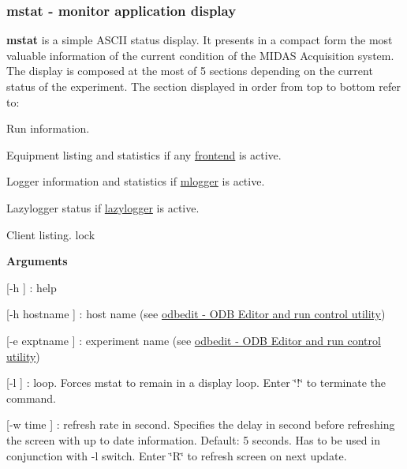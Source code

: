 \par
 \label{RC_Monitor_idx_mstat-utility}
\hypertarget{RC_Monitor_idx_mstat-utility}{}
 \hypertarget{RC_Monitor_RC_mstat_utility}{}\subsubsection{mstat -\/ monitor application display}\label{RC_Monitor_RC_mstat_utility}
{\bfseries mstat} is a simple ASCII status display. It presents in a compact form the most valuable information of the current condition of the MIDAS Acquisition system. The display is composed at the most of 5 sections depending on the current status of the experiment. The section displayed in order from top to bottom refer to:
\begin{DoxyItemize}
\item Run information.
\item Equipment listing and statistics if any \hyperlink{FrontendOperation_FE_frontend_utility}{frontend} is active.
\item Logger information and statistics if \hyperlink{F_Logging_F_mlogger_utility}{mlogger} is active.
\item Lazylogger status if \hyperlink{F_LogUtil_F_lazylogger_utility}{lazylogger} is active.
\item Client listing. lock
\item {\bfseries  Arguments }
\begin{DoxyItemize}
\item \mbox{[}-\/h \mbox{]} : help
\item \mbox{[}-\/h hostname \mbox{]} : host name (see \hyperlink{RC_odbedit_utility}{odbedit -\/ ODB Editor and run control utility})
\item \mbox{[}-\/e exptname \mbox{]} : experiment name (see \hyperlink{RC_odbedit_utility}{odbedit -\/ ODB Editor and run control utility})
\item \mbox{[}-\/l \mbox{]} : loop. Forces mstat to remain in a display loop. Enter \char`\"{}!\char`\"{} to terminate the command.
\item \mbox{[}-\/w time \mbox{]} : refresh rate in second. Specifies the delay in second before refreshing the screen with up to date information. Default: 5 seconds. Has to be used in conjunction with -\/l switch. Enter \char`\"{}R\char`\"{} to refresh screen on next update.
\end{DoxyItemize}
\end{DoxyItemize}


